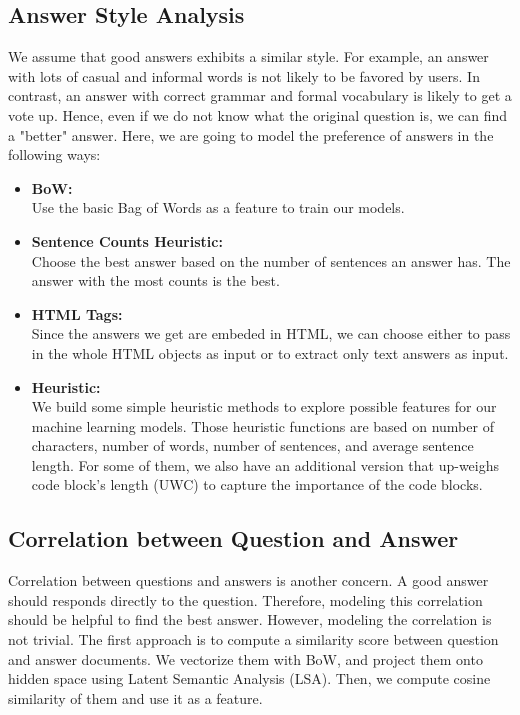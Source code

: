 \documentclass[11pt]{article}
\begin{document}
\subsection{Answer Style Analysis}
We assume that good answers exhibits a similar style. For example, an answer with lots of casual and informal words is not likely to be favored by users. In contrast, an answer with correct grammar and formal vocabulary is likely to get a vote up. Hence, even if we do not know what the original question is, we can find a "better" answer.  Here, we are going to model the preference of answers in the following ways:
\begin{itemize}
\setlength\itemsep{0em}
\item \textbf{BoW:}
\\Use the basic Bag of Words as a feature to train our models.
\item \textbf{Sentence Counts Heuristic:}
\\Choose the best answer based on the number of sentences an answer has. The answer with the most counts is the best.
\item \textbf{HTML Tags:}
\\Since the answers we get are embeded in HTML, we can choose either to pass in the whole HTML objects as input or to extract only text answers as input. 
\item \textbf{Heuristic:}
\\We build some simple heuristic methods to explore possible features for our machine learning models. Those heuristic functions are based on number of characters, number of words, number of sentences, and average sentence length. For some of them, we also have an additional version that up-weighs code block's length (UWC) to capture the importance of the code blocks. 

\end{itemize}


\subsection{Correlation between Question and Answer}
Correlation between questions and answers is another concern. A good answer should responds directly to the question. Therefore, modeling this correlation should be helpful to find the best answer. However, modeling the correlation is not trivial. The first approach is to compute a similarity score between question and answer documents. We vectorize them with BoW, and project them onto hidden space using Latent Semantic Analysis (LSA). Then, we compute cosine similarity of them and use it as a feature.
\end{document}
